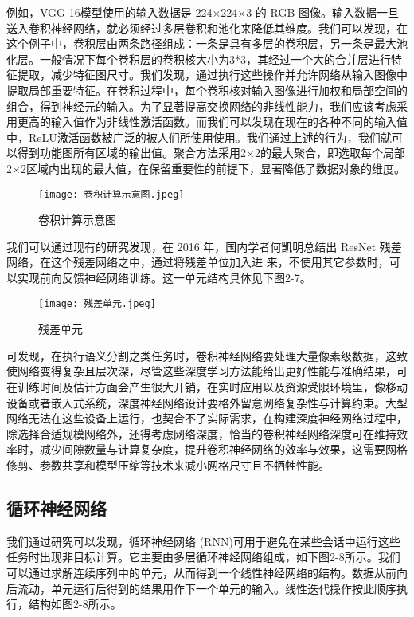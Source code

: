 例如，VGG-16模型\cite{simonyan2014very}使用的输入数据是 224×224×3 的 RGB 图像。输入数据一旦送入卷积神经网络，就必须经过多层卷积和池化来降低其维度。我们可以发现，在这个例子中，卷积层由两条路径组成：一条是具有多层的卷积层，另一条是最大池化层。一般情况下每个卷积层的卷积核大小为3*3，其经过一个大的合并层进行特征提取，减少特征图尺寸。我们发现，通过执行这些操作并允许网络从输入图像中提取局部重要特征。在卷积过程中，每个卷积核对输入图像进行加权和局部空间的组合，得到神经元的输入。为了显著提高交换网络的非线性能力，我们应该考虑采用更高的输入值作为非线性激活函数。而我们可以发现在现在的各种不同的输入值中，ReLU激活函数被广泛的被人们所使用使用。我们通过上述的行为，我们就可以得到功能图所有区域的输出值。聚合方法采用2×2的最大聚合，即选取每个局部2×2区域内出现的最大值，在保留重要性的前提下，显著降低了数据对象的维度。

\begin{figure}[hbt]
	\centering
	\texttt{[image: 卷积计算示意图.jpeg]}
	\caption{卷积计算示意图}
	\label{f.example}
\end{figure}

我们可以通过现有的研究发现，在 2016 年，国内学者何凯明总结出 ResNet 残差网络\cite{he2016deep}，在这个残差网络之中，通过将残差单位加入进
来，不使用其它参数时，可以实现前向反馈神经网络训练。这一单元结构具体见下图2-7。

\begin{figure}[hbt]
	\centering
	\texttt{[image: 残差单元.jpeg]}
	\caption{残差单元}
	\label{f.example}
\end{figure}

可发现，在执行语义分割之类任务时，卷积神经网络要处理大量像素级数据，这致使网络变得复杂且层次深，尽管这些深度学习方法能给出更好性能与准确结果，可在训练时间及估计方面会产生很大开销，在实时应用以及资源受限环境里，像移动设备或者嵌入式系统，深度神经网络设计要格外留意网络复杂性与计算约束。大型网络无法在这些设备上运行，也契合不了实际需求，在构建深度神经网络过程中，除选择合适规模网络外，还得考虑网络深度，恰当的卷积神经网络深度可在维持效率时，减少间隙数量与计算复杂度，提升卷积神经网络的效率与效果，这需要网格修剪、参数共享和模型压缩等技术来减小网格尺寸且不牺牲性能。

\subsection{循环神经网络}

我们通过研究可以发现，循环神经网络 (RNN)\cite{zaremba2014recurrent}可用于避免在某些会话中运行这些任务时出现非目标计算。它主要由多层循环神经网络组成，如下图2-8所示。我们可以通过求解连续序列中的单元，从而得到一个线性神经网络的结构。数据从前向后流动，单元运行后得到的结果用作下一个单元的输入。线性迭代操作按此顺序执行，结构如图2-8所示。


